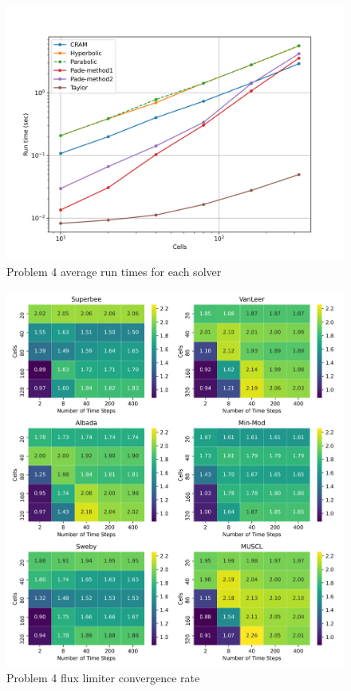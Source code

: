 \clearpage

\begin{figure}[p]
    \centering
    \includegraphics[width=6in]{images/chapter-5/problem4Runtimes.png}
    \caption{Problem 4 average run times for each solver}
    \label{fig:problem4_runtimes}
\end{figure}

\clearpage

\begin{figure}[p]
    \centering
    \includegraphics[width=6in]{images/chapter-5/problem4FluxLimiterConvergenceRate.png}
    \caption{Problem 4 flux limiter convergence rate}
    \label{fig:problem4_fluxlimiter_convergence_rate}
\end{figure}

